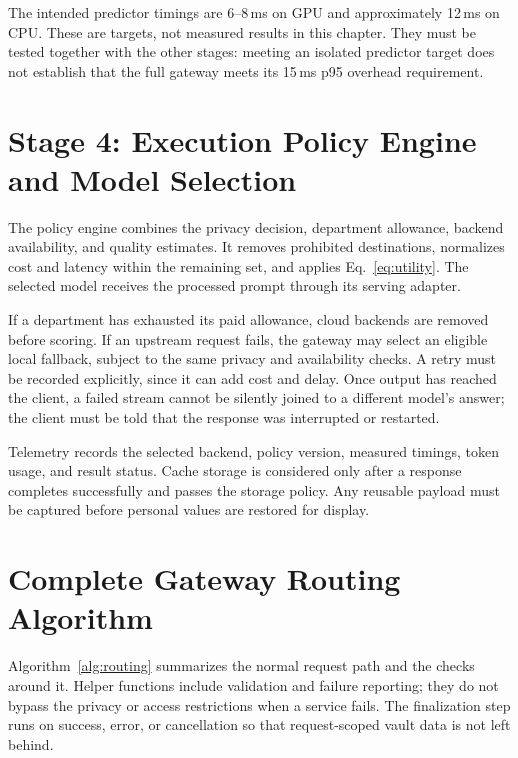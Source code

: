 The intended predictor timings are 6--8\,ms on GPU and approximately 12\,ms on CPU. These are targets, not measured results in this chapter. They must be tested together with the other stages: meeting an isolated predictor target does not establish that the full gateway meets its 15\,ms p95 overhead requirement.

\section{Stage 4: Execution Policy Engine and Model Selection}
\label{sec:stage4-policy}

The policy engine combines the privacy decision, department allowance, backend availability, and quality estimates. It removes prohibited destinations, normalizes cost and latency within the remaining set, and applies Eq.~\ref{eq:utility}. The selected model receives the processed prompt through its serving adapter.

If a department has exhausted its paid allowance, cloud backends are removed before scoring. If an upstream request fails, the gateway may select an eligible local fallback, subject to the same privacy and availability checks. A retry must be recorded explicitly, since it can add cost and delay. Once output has reached the client, a failed stream cannot be silently joined to a different model's answer; the client must be told that the response was interrupted or restarted.

Telemetry records the selected backend, policy version, measured timings, token usage, and result status. Cache storage is considered only after a response completes successfully and passes the storage policy. Any reusable payload must be captured before personal values are restored for display.

\section{Complete Gateway Routing Algorithm}
\label{sec:algorithm}

Algorithm~\ref{alg:routing} summarizes the normal request path and the checks around it. Helper functions include validation and failure reporting; they do not bypass the privacy or access restrictions when a service fails. The finalization step runs on success, error, or cancellation so that request-scoped vault data is not left behind.

